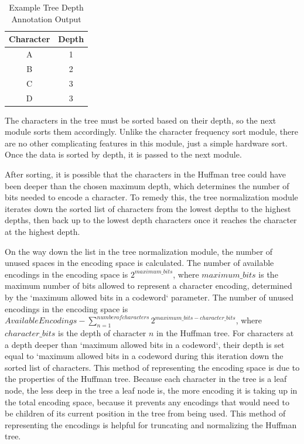 \documentclass[doublespace,nopageskip]{VTthesis}
\begin{document}
\begin{table}[htb]
	\centering
	\caption{Example Tree Depth Annotation Output}
	\begin{tabular}{cc}
	    \toprule
	    Character & Depth \\
	    \midrule
	    A & 1 \\
	    \midrule
	    B & 2 \\
	    \midrule
	    C & 3 \\
	    \midrule
	    D & 3 \\
	    \bottomrule
	\end{tabular}
	\label{tab:tree_depth_annotation_output}
\end{table}

The characters in the tree must be sorted based on their depth, so the next module sorts them accordingly. Unlike the character frequency sort module, there are no other complicating features in this module, just a simple hardware sort. Once the data is sorted by depth, it is passed to the next module.

After sorting, it is possible that the characters in the Huffman tree could have been deeper than the chosen maximum depth, which determines the number of bits needed to encode a character. To remedy this, the tree normalization module iterates down the sorted list of characters from the lowest depths to the highest depths, then back up to the lowest depth characters once it reaches the character at the highest depth.

On the way down the list in the tree normalization module, the number of unused spaces in the encoding space is calculated. The number of available encodings in the encoding space is $2^{maximum\_bits}$, where $maximum\_bits$ is the maximum number of bits allowed to represent a character encoding, determined by the `maximum allowed bits in a codeword` parameter. The number of unused encodings in the encoding space is $Available Encodings - \sum_{n=1}^{number of characters}2^{maximum\_bits-character\_bits}$, where $character\_bits$ is the depth of character $n$ in the Huffman tree. For characters at a depth deeper than `maximum allowed bits in a codeword`, their depth is set equal to `maximum allowed bits in a codeword during this iteration down the sorted list of characters. This method of representing the encoding space is due to the properties of the Huffman tree. Because each character in the tree is a leaf node, the less deep in the tree a leaf node is, the more encoding it is taking up in the total encoding space, because it prevents any encodings that would need to be children of its current position in the tree from being used. This method of representing the encodings is helpful for truncating and normalizing the Huffman tree.
\end{document}
